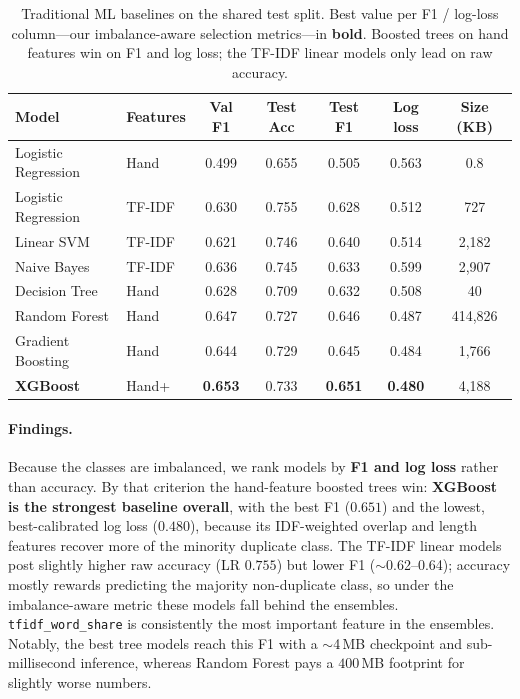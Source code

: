 \begin{table}[h]
    \centering
    \caption{Traditional ML baselines on the shared test split. Best value per
    F1 / log-loss column---our imbalance-aware selection metrics---in
    \textbf{bold}. Boosted trees on hand features win on F1 and log loss; the
    TF-IDF linear models only lead on raw accuracy.}
    \label{tab:tradml}
    \small
    \begin{tabular}{llccccc}
        \toprule
        \textbf{Model} & \textbf{Features} & \textbf{Val F1} & \textbf{Test Acc} & \textbf{Test F1} & \textbf{Log loss} & \textbf{Size (KB)} \\
        \midrule
        Logistic Regression & Hand    & 0.499  & 0.655 & 0.505 & 0.563 & 0.8 \\
        Logistic Regression & TF-IDF  & 0.630  & 0.755 & 0.628 & 0.512 & 727 \\
        Linear SVM          & TF-IDF  & 0.621  & 0.746 & 0.640 & 0.514 & 2{,}182 \\
        Naive Bayes         & TF-IDF  & 0.636  & 0.745 & 0.633 & 0.599 & 2{,}907 \\
        Decision Tree       & Hand    & 0.628  & 0.709 & 0.632 & 0.508 & 40 \\
        Random Forest       & Hand    & 0.647  & 0.727 & 0.646 & 0.487 & 414{,}826 \\
        Gradient Boosting   & Hand    & 0.644  & 0.729 & 0.645 & 0.484 & 1{,}766 \\
        \textbf{XGBoost}    & Hand+   & \textbf{0.653} & 0.733 & \textbf{0.651} & \textbf{0.480} & 4{,}188 \\
        \bottomrule
    \end{tabular}
\end{table}

\paragraph{Findings.}
Because the classes are imbalanced, we rank models by \textbf{F1 and log loss}
rather than accuracy. By that criterion the hand-feature boosted trees win:
\textbf{XGBoost is the strongest baseline overall}, with the best F1 ($0.651$)
and the lowest, best-calibrated log loss ($0.480$), because its IDF-weighted
overlap and length features recover more of the minority duplicate class. The
TF-IDF linear models post slightly higher raw accuracy (LR $0.755$) but lower F1
($\sim$0.62--0.64); accuracy mostly rewards predicting the majority
non-duplicate class, so under the imbalance-aware metric these models fall behind
the ensembles. \texttt{tfidf\_word\_share} is consistently the most important
feature in the ensembles. Notably, the best tree models reach this F1 with a
$\sim$4\,MB checkpoint and sub-millisecond inference, whereas Random Forest pays
a $400$\,MB footprint for slightly worse numbers.

